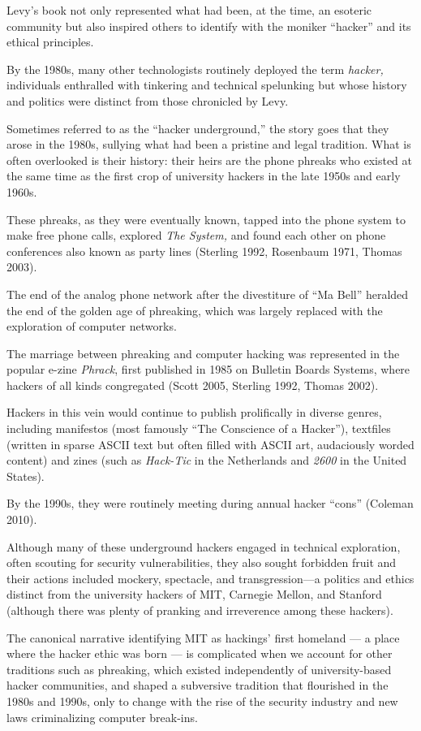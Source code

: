 \documentclass[letterpaper,12pt,english]{sphinxmanual}
\begin{document}
Levy’s
book
not
only
represented
what
had
been,
at
the
time,
an
esoteric
community but
also
inspired
others
to
identify
with
the
moniker
“hacker”
and
its
ethical
principles.

By
the
1980s,
many
other
technologists
routinely deployed
the
term
\emph{hacker,}
individuals
enthralled
with
tinkering
and
technical spelunking
but
whose
history
and
politics
were distinct
from those chronicled by Levy.

Sometimes
referred
to
as
the
“hacker underground,”
the story goes that they arose in the 1980s, sullying what had been a pristine and legal tradition. What is often overlooked is
their history: their heirs
are the
phone
phreaks
who
existed at the same time as the
first crop of university hackers
in
the
late
1950s
and
early
1960s.

These phreaks, as they were
eventually known,
tapped
into
the
phone
system
to
make
free
phone
calls,
explored \emph{The System,} and
found
each
other
on
phone
conferences
also
known
as
party
lines
(Sterling
1992, Rosenbaum 1971, Thomas
2003).

The
end
of
the
analog
phone
network
after the divestiture of “Ma Bell”
heralded
the
end
of
the
golden
age
of
phreaking, which was largely
replaced
with
the
exploration
of
computer
networks.

The marriage
between phreaking
and computer hacking
was
represented
in
the
popular
e-zine
\emph{Phrack},
first
published
in
1985
on
Bulletin
Boards
Systems,
where
hackers
of
all
kinds
congregated
(Scott
2005,
Sterling
1992,
Thomas
2002).

Hackers
in this vein
would
continue
to
publish
prolifically
in diverse
genres,
including
manifestos
(most famously “The
Conscience
of
a
Hacker”),
textfiles
(written
in
sparse
ASCII
text
but
often
filled
with
ASCII art,
audaciously
worded
content)
and
zines
(such as \emph{Hack-Tic} in
the
Netherlands
and
\emph{2600}
in
the
United
States).

By the
1990s, they
were
routinely
meeting
during
annual
hacker
“cons”
(Coleman
2010).

Although
many
of
these
underground
hackers
engaged
in
technical
exploration,
often scouting for
security
vulnerabilities,
they
also
sought
forbidden
fruit and their
actions
included
mockery,
spectacle,
and
transgression—a
politics
and
ethics
distinct
from
the
university
hackers
of
MIT,
Carnegie
Mellon,
and
Stanford
(although
there
was
plenty
of
pranking
and irreverence
among
these
hackers).

The canonical narrative identifying MIT as hackings’ first homeland — a place where the hacker ethic was born — is complicated when we account for other traditions such as phreaking,
which existed independently of university-based hacker communities, and shaped a subversive tradition that flourished in the 1980s and 1990s, only to change with the rise of the security industry and new laws criminalizing computer break-ins.
\end{document}
